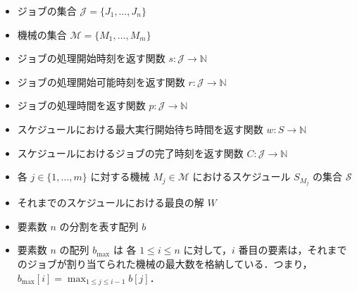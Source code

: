\documentclass[12pt]{optlab-bachelor}
\begin{document}
\begin{itemize}
  \item ジョブの集合 $\mathcal{J} = \{J_1,\ldots,J_n\}$
  \item 機械の集合 $\mathcal{M} = \{M_1,\ldots,M_m\}$
  \item ジョブの処理開始時刻を返す関数 $s : \mathcal{J} \to \mathbb{N}$
  \item ジョブの処理開始可能時刻を返す関数 $r : \mathcal{J} \to \mathbb{N}$
  \item ジョブの処理時間を返す関数 $p : \mathcal{J} \to \mathbb{N}$
  \item スケジュールにおける最大実行開始待ち時間を返す関数 $w : S \to \mathbb{N}$
  \item スケジュールにおけるジョブの完了時刻を返す関数 $C : \mathcal{J} \to \mathbb{N}$
  \item 各 $j \in \{1,\ldots,m\}$ に対する機械 $M_j \in \mathcal{M}$ におけるスケジュール $S_{M_j}$ の集合 $\mathcal{S}$
  \item それまでのスケジュールにおける最良の解 $W$
  \item 要素数 $n$ の分割を表す配列 $b$
  \item 要素数 $n$ の配列 $b_{\max}$ は 各 $1 \le i \le n$ に対して，$i$ 番目の要素は，それまでのジョブが割り当てられた機械の最大数を格納している．つまり，$b_{\max}[i] = \displaystyle \max_{1\le j \le i - 1}b[j]$．
\end{itemize}
\end{document}
